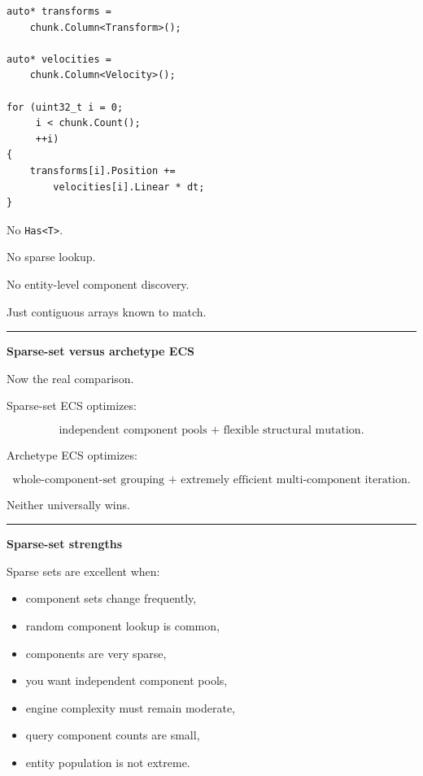 \begin{verbatim}
auto* transforms =
    chunk.Column<Transform>();

auto* velocities =
    chunk.Column<Velocity>();

for (uint32_t i = 0;
     i < chunk.Count();
     ++i)
{
    transforms[i].Position +=
        velocities[i].Linear * dt;
}
\end{verbatim}

No \texttt{Has\textless{}T\textgreater{}}.

No sparse lookup.

No entity-level component discovery.

Just contiguous arrays known to match.

\begin{center}\rule{0.5\linewidth}{0.5pt}\end{center}

\textbf{Sparse-set versus archetype ECS}

Now the real comparison.

Sparse-set ECS optimizes:

\[
\boxed{
\text{independent component pools + flexible structural mutation}.
}
\]

Archetype ECS optimizes:

\[
\boxed{
\text{whole-component-set grouping + extremely efficient multi-component iteration}.
}
\]

Neither universally wins.

\begin{center}\rule{0.5\linewidth}{0.5pt}\end{center}

\textbf{Sparse-set strengths}

Sparse sets are excellent when:

\begin{itemize}
\tightlist
\item
  component sets change frequently,
\item
  random component lookup is common,
\item
  components are very sparse,
\item
  you want independent component pools,
\item
  engine complexity must remain moderate,
\item
  query component counts are small,
\item
  entity population is not extreme.
\end{itemize}

